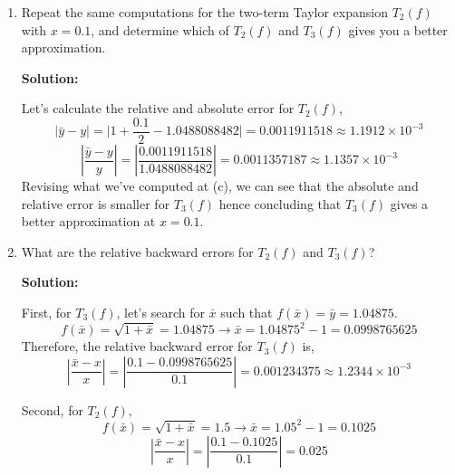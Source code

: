 \documentclass[11pt]{article}
\newenvironment{solution}
  {\par\noindent\textbf{Solution:}\par}
  {\par}
\begin{document}
\begin{enumerate}
\begin{enumerate}
\begin{solution}
    
    The relative error is, 
    $$\left| \frac{\bar{y} - y}{y} \right| = \left| \frac{1.04875 - 1.0488088482 }{ 1.0488088482}  \right| = 0.0000561096 = 5.6110 \times 10^{-5}$$    
  \end{solution}
  
\item Repeat the same computations for the two-term Taylor expansion $T_2(f)$ with $x=0.1$, and determine which of $T_2(f)$ and $T_3(f)$ gives you a better approximation. 
  \begin{solution}
    Let's calculate the relative and absolute error for $T_2(f)$,
    $$\vert \bar{y} - y \vert = \vert 1 + \frac{0.1}{2} - 1.0488088482 \vert=0.0011911518 \approx 1.1912 \times 10^{-3}$$
    $$\left| \frac{\bar{y} - y}{y} \right| = \left| \frac{0.0011911518 }{1.0488088482 } \right| =  0.0011357187 \approx 1.1357 \times 10^{-3}$$
    Revising what we've computed at (c), we can see that the absolute and relative error is smaller for $T_3(f)$ hence concluding that $T_3(f)$ gives a better approximation at $x=0.1$. 
  \end{solution}

\item What are the relative backward errors  for $T_2(f)$ and $T_3(f)$?

  \begin{solution}
    First, for $T_3(f)$, let's search for $\bar{x}$ such that $f(\bar{x})=\bar{y}=1.04875$.
    $$f(\bar{x})=\sqrt{1+\bar{x}} = 1.04875 \to \bar{x} = 1.04875^2-1 =0.0998765625$$
    Therefore, the relative backward error for $T_3(f)$ is, 
    $$\left| \frac{\bar{x} - x}{x} \right| = \left| \frac{0.1 - 0.0998765625}{0.1} \right| = 0.001234375  \approx 1.2344 \times 10^{-3}$$

    Second, for $T_2(f)$,
    $$f(\bar{x}) = \sqrt{1+\bar{x}} = 1.5 \to \bar{x} = 1.05^2 - 1 = 0.1025$$
    $$\left| \frac{\bar{x} - x}{x} \right| = \left| \frac{0.1-0.1025}{0.1} \right| = 0.025$$

    
  
  \end{solution}


\end{enumerate}
\end{enumerate}
\end{document}

